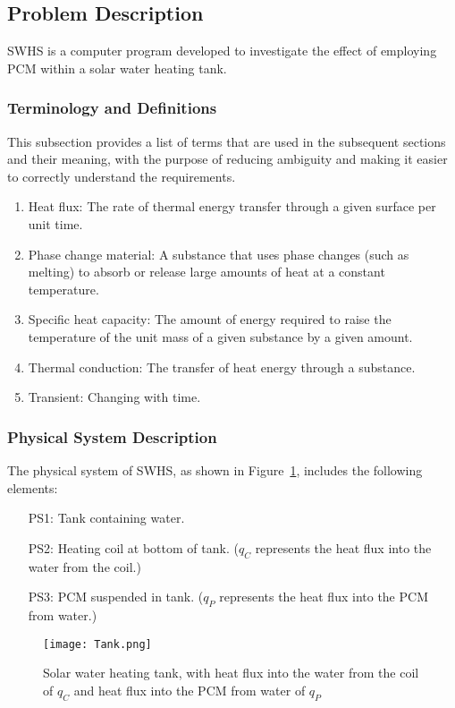 \documentclass[12pt]{article}
\begin{document}
\subsection{Problem Description}
\label{Sec:ProbDesc}
SWHS is a computer program developed to investigate the effect of employing PCM within a solar water heating tank.
\subsubsection{Terminology and Definitions}
\label{Sec:TermandDefi}
This subsection provides a list of terms that are used in the subsequent sections and their meaning, with the purpose of reducing ambiguity and making it easier to correctly understand the requirements.
\begin{enumerate}
\item{Heat flux: The rate of thermal energy transfer through a given surface per unit time.}
\item{Phase change material: A substance that uses phase changes (such as melting) to absorb or release large amounts of heat at a constant temperature.}
\item{Specific heat capacity: The amount of energy required to raise the temperature of the unit mass of a given substance by a given amount.}
\item{Thermal conduction: The transfer of heat energy through a substance.}
\item{Transient: Changing with time.}
\end{enumerate}
\subsubsection{Physical System Description}
\label{Sec:PhysSystDesc}
The physical system of SWHS, as shown in Figure~\ref{Figure:SolawateheattankwithheatfluxintothewatefromthecoilofandheatfluxintothePCMfromwateof}, includes the following elements:
\begin{itemize}
\item[PS1:]Tank containing water.
\item[PS2:]Heating coil at bottom of tank. ($q_{C}$ represents the heat flux into the water from the coil.)
\item[PS3:]PCM suspended in tank. ($q_{P}$ represents the heat flux into the PCM from water.)
\end{itemize}
\begin{figure}
\begin{center}
\texttt{[image: Tank.png]}
\caption{Solar water heating tank, with heat flux into the water from the coil of $q_{C}$ and heat flux into the PCM from water of $q_{P}$}
\label{Figure:SolawateheattankwithheatfluxintothewatefromthecoilofandheatfluxintothePCMfromwateof}
\end{center}
\end{figure}
\end{document}
